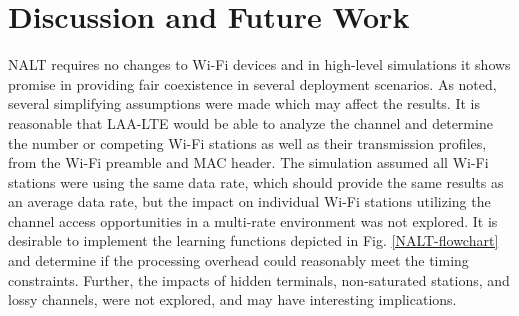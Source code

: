 \section{Discussion and Future Work}
\label{future-work}
NALT requires no changes to \mbox{Wi-Fi} devices and in high-level simulations it shows promise in providing fair coexistence in several deployment scenarios.  As noted, several simplifying assumptions were made which may affect the results.  It is reasonable that \mbox{LAA-LTE} would be able to analyze the channel and determine the number or competing \mbox{Wi-Fi} stations as well as their transmission profiles, from the \mbox{Wi-Fi} preamble and MAC header.  The simulation assumed all \mbox{Wi-Fi} stations were using the same data rate, which should provide the same results as an average data rate, but the impact on individual \mbox{Wi-Fi} stations utilizing the channel access opportunities in a multi-rate environment was not explored.  It is desirable to implement the learning functions depicted in Fig. \ref{NALT-flowchart} and determine if the processing overhead could reasonably meet the timing constraints. Further, the impacts of hidden terminals, non-saturated stations, and lossy channels, were not explored, and may have interesting implications. 

